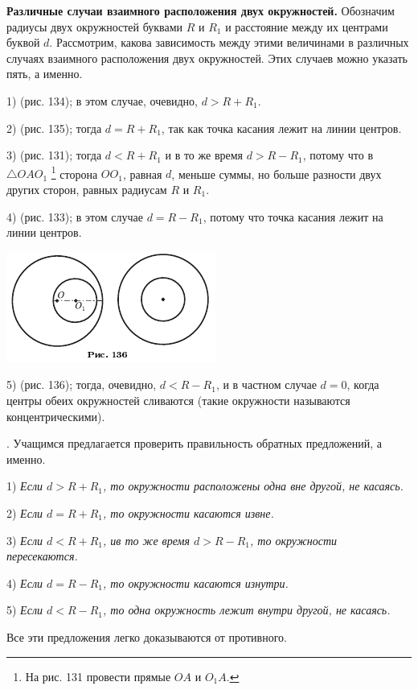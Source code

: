 \documentclass[oneside]{book}
\begin{document}
\textbf{Различные случаи взаимного расположения двух окружностей.}
Обозначим радиусы двух окружностей буквами $R$ и $R_1$ и расстояние между их центрами буквой $d$.
Рассмотрим, какова зависимость между этими величинами в различных случаях взаимного расположения двух окружностей.
Этих случаев можно указать пять, а именно.

1)  (рис. 134);
в этом случае, очевидно, $d>R+R_1$.

2)  (рис. 135);
тогда $d=R+R_1$, так как точка касания лежит на линии центров.

3)  (рис. 131);
тогда $d<R+R_1$ и в то же время $d>R-R_1$, потому что в $\triangle OAO_1$%
\footnote{На рис. 131 провести прямые $OA$ и $O_1A$.}
сторона $OO_1$, равная $d$, меньше суммы, но больше разности двух других сторон, равных радиусам $R$ и $R_1$.

4)  (рис. 133);
в этом случае $d=R-R_1$, потому что точка касания лежит на линии центров.

\includegraphics{pics/ris-136}

5)  (рис. 136);
тогда, очевидно, $d<R-R_1$, и в частном случае $d= 0$, когда центры обеих окружностей сливаются (такие окружности называются концентрическими).

.
Учащимся предлагается проверить правильность обратных предложений, а именно.

1) \emph{Если $d>R+R_1$, то окружности расположены одна вне другой, не касаясь.}

2) \emph{Если $d=R+R_1$, то окружности касаются извне.}

3) \emph{Если $d<R+R_1$, ив то же время $d>R-R_1$, то окружности пересекаются.}

4) \emph{Если $d=R-R_1$, то окружности касаются изнутри.}

5) \emph{Если $d<R-R_1$, то одна окружность лежит внутри другой, не касаясь.}

Все эти предложения легко доказываются от противного.
\end{document}
